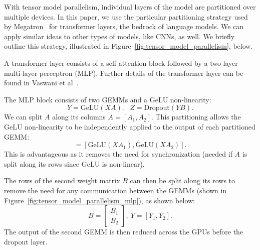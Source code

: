With tensor model parallelism, individual layers of the model are partitioned over multiple devices. In this paper, we use the particular partitioning strategy used by Megatron~\cite{shoeybi2019megatron} for transformer layers, the bedrock of language models. We can apply similar ideas to other types of models, like CNNs, as well. We briefly outline this strategy, illustrated in Figure~\ref{fig:tensor_model_parallelism}, below.

A transformer layer consists of a self-attention block followed by a two-layer multi-layer perceptron (MLP). Further details of the transformer layer can be found in Vaswani et al~\cite{vaswani2017attention}. 

The MLP block consists of two GEMMs and a GeLU non-linearity:
$$Y = \textrm{GeLU}(XA). \, \, \, \, \, Z = \textrm{Dropout}(YB).$$
We can split $A$ along its columns $A=[A_1, A_2]$. This partitioning allows the GeLU non-linearity to be independently applied to the output of each partitioned GEMM:
 \begin{equation}
    [Y_1, Y_2]= [\textrm{GeLU}(XA_1), \textrm{GeLU}(XA_2)].  \nonumber
 \end{equation}
 This is advantageous as it removes the need for synchronization (needed if $A$ is split along its rows since GeLU is non-linear).
 
 The rows of the second weight matrix $B$ can then be split along its rows to remove the need for any communication between the GEMMs (shown in Figure~\ref{fig:tensor_model_parallelism_mlp}), as shown below:
 \begin{equation}
    B=\begin{bmatrix}
        B_1 \\
        B_2
    \end{bmatrix}, \
     Y = [Y_1, Y_2]. \nonumber
 \end{equation}
 The output of the second GEMM is then reduced across the GPUs before the dropout layer.
 
